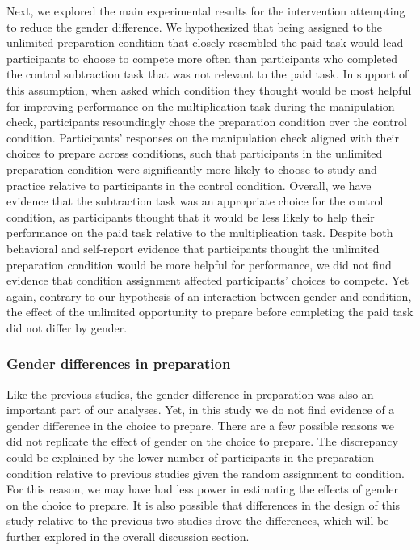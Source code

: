 \documentclass[letterpaper, nobind]{templates/ociamthesis}
\begin{document}
Next, we explored the main experimental results for the intervention attempting to reduce the gender difference. We hypothesized that being assigned to the unlimited preparation condition that closely resembled the paid task would lead participants to choose to compete more often than participants who completed the control subtraction task that was not relevant to the paid task. In support of this assumption, when asked which condition they thought would be most helpful for improving performance on the multiplication task during the manipulation check, participants resoundingly chose the preparation condition over the control condition. Participants' responses on the manipulation check aligned with their choices to prepare across conditions, such that participants in the unlimited preparation condition were significantly more likely to choose to study and practice relative to participants in the control condition. Overall, we have evidence that the subtraction task was an appropriate choice for the control condition, as participants thought that it would be less likely to help their performance on the paid task relative to the multiplication task. Despite both behavioral and self-report evidence that participants thought the unlimited preparation condition would be more helpful for performance, we did not find evidence that condition assignment affected participants' choices to compete. Yet again, contrary to our hypothesis of an interaction between gender and condition, the effect of the unlimited opportunity to prepare before completing the paid task did not differ by gender.

\hypertarget{gender-differences-in-preparation-4}{%
\subsubsection{Gender differences in preparation}\label{gender-differences-in-preparation-4}}

Like the previous studies, the gender difference in preparation was also an important part of our analyses. Yet, in this study we do not find evidence of a gender difference in the choice to prepare. There are a few possible reasons we did not replicate the effect of gender on the choice to prepare. The discrepancy could be explained by the lower number of participants in the preparation condition relative to previous studies given the random assignment to condition. For this reason, we may have had less power in estimating the effects of gender on the choice to prepare. It is also possible that differences in the design of this study relative to the previous two studies drove the differences, which will be further explored in the overall discussion section.
\end{document}
